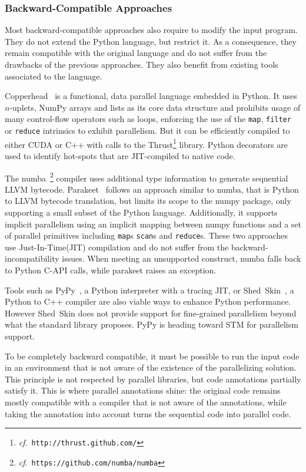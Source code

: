 \documentclass[conference]{IEEEtran}
\begin{document}
\subsubsection{Backward-Compatible Approaches}

Most backward-compatible approaches also require to modify the input program.
They do not extend the Python language, but restrict it. As a consequence, they
remain compatible with the original language and do not suffer from the
drawbacks of the previous approaches. They also benefit from existing tools
associated to the language.

Copperhead~\cite{copperhead2011} is a functional, data parallel language
embedded in Python. It uses $n$-uplets, NumPy arrays and lists as its core data
structure and prohibits usage of many control-flow operators such as loops,
enforcing the use of the \texttt{map}, \texttt{filter} or \texttt{reduce}
intrinsics to exhibit parallelism. But it can be efficiently compiled to either
CUDA or C++ with calls to the Thrust\footnote{\emph{cf}.\
\texttt{http://thrust.github.com/}} library. Python decorators are used to
identify hot-spots that are JIT-compiled to native code.

The numba~\footnote{\emph{cf}.\ \texttt{https://github.com/numba/numba}}
compiler uses additional type information to generate sequential LLVM bytecode.
Parakeet~\cite{parakeet2012} follows an approach similar to numba, that is
Python to LLVM bytecode translation, but limits its scope to the numpy package,
only supporting a small subset of the Python language. Additionally, it supports
implicit parallelism using an implicit mapping between numpy functions and a set
of parallel primitives including \texttt{map}s \texttt{scan}s and
\texttt{reduce}s. These two approaches use Just-In-Time(JIT) compilation and do
not suffer from the backward-incompatibility issues. When meeting an unsupported
construct, numba falls back to Python C-API calls, while parakeet raises an
exception.

Tools such as PyPy~\cite{pypy2009}, a Python interpreter with a tracing JIT, or
Shed~Skin~\cite{shedskin2006}, a Python to C++ compiler are also viable ways to
enhance Python performance. However Shed~Skin does not provide support for
fine-grained parallelism beyond what the standard library proposes. PyPy is
heading toward STM for parallelism support.

To be completely backward compatible, it must be possible to run the input code
in an environment that is not aware of the existence of the parallelizing
solution. This principle is not respected by parallel libraries, but code
annotations partially satisfy it. This is where parallel annotations shine: the
original code remains mostly compatible with a compiler that is not aware of the
annotations, while taking the annotation into account turns the sequential code
into parallel code.
\end{document}
